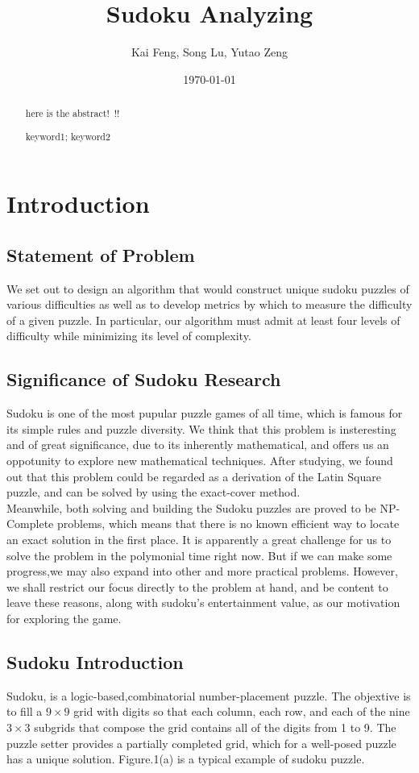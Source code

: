 \documentclass{mcmthesis}
\title{Sudoku Analyzing}
\author{Kai Feng, Song Lu, Yutao Zeng }
\date{\today}
\begin{document}
\begin{abstract}
here is the abstract!~!!
\begin{keywords}
keyword1; keyword2
\end{keywords}
\end{abstract}
\maketitle

\section{Introduction}
\subsection{Statement of Problem}
We set out to design an algorithm that would construct unique sudoku puzzles of various difficulties as well as to develop metrics by which to measure the difficulty of a given puzzle. In particular, our algorithm must admit at least four levels of difficulty while minimizing its level of complexity.

\subsection{Significance of Sudoku Research}
Sudoku is one of the most pupular puzzle games of all time, which is famous for its simple rules and puzzle diversity. We think that this problem is insteresting and of great significance, due to its inherently mathematical, and offers us an oppotunity to explore new mathematical techniques. After studying, we found out that this problem could be regarded as a derivation of the Latin Square puzzle, and can be solved by using the exact-cover method.\\
\indent Meanwhile, both solving and building the Sudoku puzzles are proved to be NP-Complete problems, which means that there is no known efficient way to locate an exact solution in the first place. It is apparently a great challenge for us to solve the problem in the polymonial time right now. But if we can make some progress,we may also expand into other and more practical problems. However, we shall restrict our focus directly to the problem at hand, and be content to leave these reasons, along with sudoku's entertainment value, as our motivation for exploring the game. 

\subsection{Sudoku Introduction}
Sudoku, is a logic-based,combinatorial number-placement puzzle. The objextive is to fill a $9\times9$ grid with digits so that each column, each row, and each of the nine $3\times3$ subgrids that compose the grid contains all of the digits from 1 to 9. The puzzle setter provides a partially completed grid, which for a well-posed puzzle has a unique solution. Figure.1(a) is a typical example of sudoku puzzle.
\end{document}
